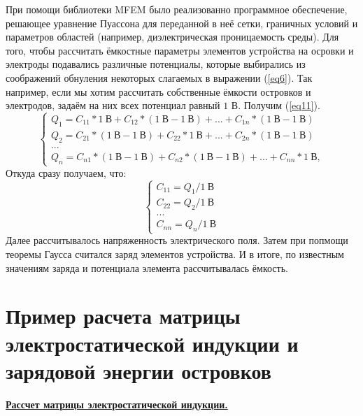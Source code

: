 \documentclass[a4paper,12pt]{report} %
\begin{document}
При помощи библиотеки MFEM было реализованно программное обеспечение, решающее уравнение Пуассона для переданной в неё сетки, граничных условий и параметров областей (например, диэлектрическая проницаемость среды). Для того, чтобы рассчитать ёмкостные параметры элементов устройства на осровки и электроды подавались различные потенциалы, которые выбирались из соображений обнуления некоторых слагаемых в выражении (\ref{eq6}). Так например, если мы хотим рассчитать собственные ёмкости островков и электродов, задаём на них всех потенциал равный $1$ В. Получим (\ref{eq11}).
\begin{equation}\label{eq11}
    \begin{cases}
        Q_1 = C_{11}*1\ В+C_{12}*(1\ В-1\ В)+...+C_{1n}*(1\ В-1\ В)
        \\
        Q_2 = C_{21}*(1\ В-1\ В)+C_{22}*1\ В+...+C_{2n}*(1\ В-1\ В)
        \\
        ...
        \\
        Q_n = C_{n1}*(1\ В-1\ В)+C_{n2}*(1\ В-1\ В)+...+C_{nn}*1\ В,
    \end{cases}
\end{equation}
Откуда сразу получаем, что:
\begin{equation}\label{eq12}
    \begin{cases}
         C_{11} = Q_1/1\ В
        \\
        C_{22} = Q_2/1\ В
        \\
        ...
        \\
        C_{nn} = Q_n/1\ В
    \end{cases}
\end{equation}
Далее рассчитывалось напряженность электрического поля. Затем при попмощи теоремы Гаусса считался заряд элементов устройства. И в итоге, по известным значениям заряда и потенциала элемента рассчитывалась ёмкость.
\chapter*{Пример расчета матрицы электростатической индукции и зарядовой энергии островков}
\textbf{\underline{Рассчет матрицы электростатической индукции.}}
\end{document}
